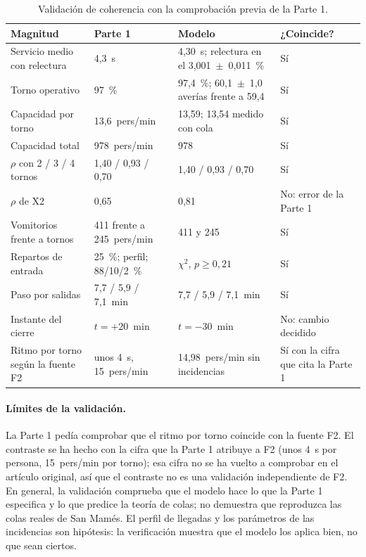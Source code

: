 \begin{table}[htbp]
\centering\small
\caption{Validación de coherencia con la comprobación previa de la Parte 1.}
\label{tab:validacion}
\begin{tabularx}{\textwidth}{@{}p{4.2cm}p{2.7cm}Yp{2.2cm}@{}}
\toprule
Magnitud & Parte 1 & Modelo & ¿Coincide? \\
\midrule
Servicio medio con relectura & 4,3~s & 4,30~s; relectura en el 3,001~$\pm$~0,011~\% & Sí \\
Torno operativo & 97~\% & 97,4~\%; 60,1~$\pm$~1,0 averías frente a 59,4 & Sí \\
Capacidad por torno & 13,6~pers/min & 13,59; 13,54 medido con cola & Sí \\
Capacidad total & 978~pers/min & 978 & Sí \\
$\rho$ con 2 / 3 / 4 tornos & 1,40 / 0,93 / 0,70 & 1,40 / 0,93 / 0,70 & Sí \\
$\rho$ de X2 & 0,65 & 0,81 & No: error de la Parte 1 \\
Vomitorios frente a tornos & 411 frente a 245~pers/min & 411 y 245 & Sí \\
Repartos de entrada & 25~\%; perfil; 88/10/2~\% & $\chi^2$, $p \ge 0{,}21$ & Sí \\
Paso por salidas & 7,7 / 5,9 / 7,1~min & 7,7 / 5,9 / 7,1~min & Sí \\
Instante del cierre & $t=+20$~min & $t=-30$~min & No: cambio decidido \\
Ritmo por torno según la fuente F2 & unos 4~s, 15~pers/min & 14,98~pers/min sin incidencias & Sí con la cifra que cita la Parte 1 \\
\bottomrule
\end{tabularx}
\end{table}

\paragraph{Límites de la validación.} La Parte 1 pedía comprobar que el ritmo por
torno coincide con la fuente F2. El contraste se ha hecho con la cifra que la
Parte 1 atribuye a F2 (unos 4~s por persona, 15~pers/min por torno); esa cifra no
se ha vuelto a comprobar en el artículo original, así que el contraste no es una
validación independiente de F2. En
general, la validación comprueba que el modelo hace lo que la Parte 1 especifica
y lo que predice la teoría de colas; no demuestra que reproduzca las colas reales
de San Mamés. El perfil de llegadas y los parámetros de las incidencias son
hipótesis: la verificación muestra que el modelo los aplica bien, no que sean
ciertos.

